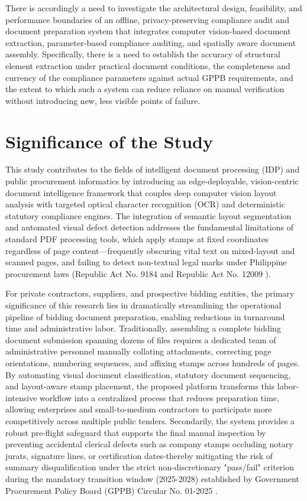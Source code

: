 There is accordingly a need to investigate the architectural design, feasibility, and performance boundaries of an offline, privacy-preserving compliance audit and document preparation system that integrates computer vision-based document extraction, parameter-based compliance auditing, and spatially aware document assembly.
Specifically, there is a need to establish the accuracy of structural element extraction under practical document conditions, the completeness and currency of the compliance parameters against actual GPPB requirements, and the extent to which such a system can reduce reliance on manual verification without introducing new, less visible points of failure.
\section{Significance of the Study}
\label{sec:significance_of_study}
This study contributes to the fields of intelligent document processing (IDP) and public procurement informatics by introducing an edge-deployable, vision-centric document intelligence framework that couples deep computer vision layout analysis with targeted optical character recognition (OCR) and deterministic statutory compliance engines.
The integration of semantic layout segmentation and automated visual defect detection addresses the fundamental limitations of standard PDF processing tools, which apply stamps at fixed coordinates regardless of page content—frequently obscuring vital text on mixed-layout and scanned pages, and failing to detect non-textual legal marks under Philippine procurement laws (Republic Act No. 9184 \cite{ref1} and Republic Act No. 12009 \cite{ref2}).

For private contractors, suppliers, and prospective bidding entities, the primary significance of this research lies in dramatically streamlining the operational pipeline of bidding document preparation, enabling reductions in turnaround time and administrative labor.
Traditionally, assembling a complete bidding document submission spanning dozens of files requires a dedicated team of administrative personnel manually collating attachments, correcting page orientations, numbering sequences, and affixing stamps across hundreds of pages.
By automating visual document classification, statutory document sequencing, and layout-aware stamp placement, the proposed platform transforms this labor-intensive workflow into a centralized process that reduces preparation time, allowing enterprises and small-to-medium contractors to participate more competitively across multiple public tenders.
Secondarily, the system provides a robust pre-flight safeguard that supports the final manual inspection by preventing accidental clerical defects such as company stamps occluding notary jurats, signature lines, or certification dates-thereby mitigating the risk of summary disqualification under the strict non-discretionary "pass/fail" criterion during the mandatory transition window (2025-2028) established by Government Procurement Policy Board (GPPB) Circular No. 01-2025 \cite{ref7}.

